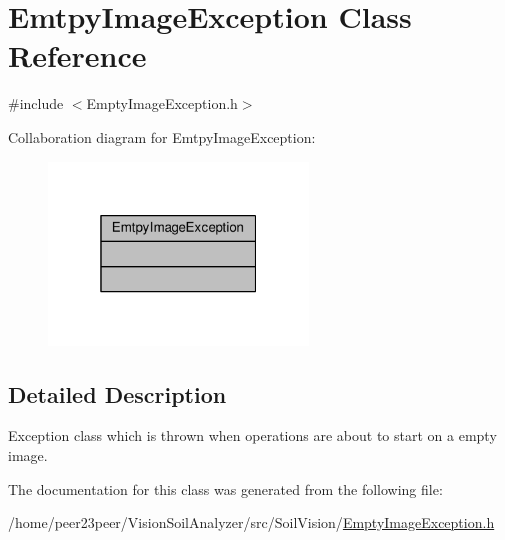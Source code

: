 \hypertarget{class_emtpy_image_exception}{}\section{Emtpy\+Image\+Exception Class Reference}
\label{class_emtpy_image_exception}


{\ttfamily \#include $<$Empty\+Image\+Exception.\+h$>$}



Collaboration diagram for Emtpy\+Image\+Exception\+:\nopagebreak
\begin{figure}[H]
\begin{center}
\leavevmode
\includegraphics[width=196pt]{class_emtpy_image_exception__coll__graph}
\end{center}
\end{figure}


\subsection{Detailed Description}
Exception class which is thrown when operations are about to start on a empty image. 

The documentation for this class was generated from the following file\+:\begin{DoxyCompactItemize}
\item 
/home/peer23peer/\+Vision\+Soil\+Analyzer/src/\+Soil\+Vision/\hyperlink{_empty_image_exception_8h}{Empty\+Image\+Exception.\+h}\end{DoxyCompactItemize}
